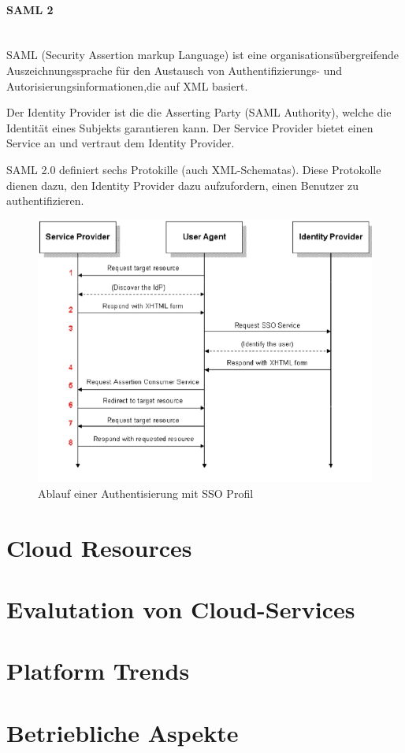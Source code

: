 \documentclass[a4paper, 11pt]{article}
\begin{document}
\paragraph{SAML 2}\mbox{}\\
SAML (Security Assertion markup Language) ist eine organisationsübergreifende Auszeichnungssprache für den Austausch von Authentifizierungs- und Autorisierungsinformationen,die auf XML basiert. 

Der Identity Provider ist die die Asserting Party (SAML Authority), welche die Identität eines Subjekts garantieren kann. Der Service Provider bietet einen Service an und vertraut dem Identity Provider.

\vspace{10px}

\noindent SAML 2.0 definiert sechs Protokille (auch XML-Schematas). Diese Protokolle dienen dazu, den Identity Provider dazu aufzufordern, einen Benutzer zu authentifizieren. 

\begin{figure}[htb]
	\centering
	\includegraphics[keepaspectratio=true,height=15\baselineskip]{sso.jpg}
	\caption{Ablauf einer Authentisierung mit SSO Profil}
	\label{fig:sso}
\end{figure}


\section{Cloud Resources}

\section{Evalutation von Cloud-Services}

\section{Platform Trends}

\section{Betriebliche Aspekte}
\end{document}
